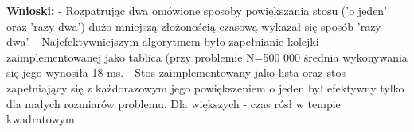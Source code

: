 \documentclass[12pt,a4paper,titlepage]{article}
\begin{document}
	
\newline
\newline
\newline
\textbf{Wnioski: }\newline
\newline
- Rozpatrując dwa omówione sposoby powiększania stosu ('o jeden' oraz 'razy dwa') dużo mniejszą złożonością czasową wykazał się sposób 'razy dwa'.\newline
\newline
- Najefektywniejszym algorytmem było zapełnianie kolejki zaimplementowanej jako tablica (przy problemie N=500 000 średnia wykonywania się jego wynosiła 18 ms.\newline
\newline
- Stos zaimplementowany jako lista oraz stos zapełniający się z każdorazowym jego powiększeniem o jeden był efektywny tylko dla małych rozmiarów problemu. Dla większych - czas rósł w tempie kwadratowym.
\end{document}
